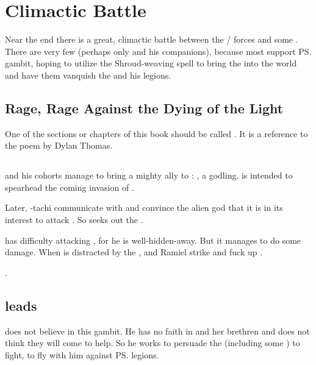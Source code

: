 \section{Climactic Battle}
Near the end there is a great, climactic battle between the \bane/\resphan{} forces and some . 
There are very few \dragons{} (perhaps only \Ishnaruchaefir{} and his companions), because most \dragons{} support \ps{\Secherdamon} gambit, hoping to utilize the \pps{\banes}{} Shroud-weaving spell to bring the \firstgendragons{} into the world and have them vanquish the \Voidbringer{} and his legions.







\subsection{Rage, Rage Against the Dying of the Light}
One of the sections or chapters of this book should be called .
It is a reference to the poem  by Dylan Thomas.







\subsection{\HothNrul}
\Vizsherioch{} and his cohorts manage to bring a mighty ally to \Miith: 
, a \xsic{} godling. 
\HothNrul{} is intended to spearhead the coming \xs{} invasion of \Miith. 

Later, \Ishnaruchaefir-tachi communicate with \HothNrul{} and convince the alien god that it is in its interest to attack \Daggerrain.
So \HothNrul{} seeks out the \banelord. 

\HothNrul{} has difficulty attacking \Daggerrain, for he is well-hidden-away. 
But it manages to do some damage. 
When \Daggerrain{} is distracted by the \xs{}, \Azraid{} and Ramiel strike and fuck up \Daggerrain. 

\HothNrul{} . 







\subsection{\Ishnaruchaefir leads \dragons}
\Ishnaruchaefir{} does not believe in this gambit. He has no faith in \Tiamat{} and her brethren and does not think they will come to help. 
So he works to persuade the \dragons{} (including some ) to fight, to fly with him against \ps{\Daggerrain}{} legions. 

